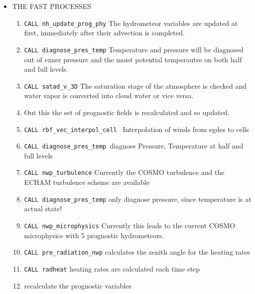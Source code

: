 \begin{itemize}

\item THE FAST PROCESSES
\begin{enumerate}

\item \texttt{CALL nh\_update\_prog\_phy} The hydrometeor variables are updated at first, immediately after their advection is completed.
\item \texttt{CALL diagnose\_pres\_temp} Temperature and pressure will be diagnosed  out of exner pressure and the moist potential temperautre on both half and full levels.

\item \texttt{CALL satad\_v\_3D} The saturation stage of the atmosphere is checked and water vapor is converted into cloud water or vice versa.

\item Out this the set of prognostic fields is recalculated and so updated.

\item \texttt{CALL rbf\_vec\_interpol\_cell } Interpolation of winds from egdes to cells

\item \texttt{CALL diagnose\_pres\_temp }diagnose Pressure, Temperature at half and full levels

\item  \texttt{CALL nwp\_turbulence} Currently the COSMO turbulence and the ECHAM turbulence scheme are available
\item \texttt{CALL diagnose\_pres\_temp} only diagnose pressure, since temperature is at actual state!
\item  \texttt{CALL nwp\_microphysics} Currently this leads to the current COSMO microphysics with 5 prognostic hydrometeors.

\item \texttt{CALL pre\_radiation\_nwp} calculates the zenith angle for the heating rates
\item \texttt{CALL radheat} heating rates are calculated each time step
\item recalculate the prognostic variables

\end{enumerate}



\end{itemize}
